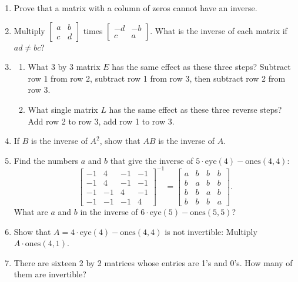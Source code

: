\documentclass[14pt, a4paper]{article}
\begin{document}
\begin{enumerate}
    \item Prove that a matrix with a column of zeros cannot have an inverse.

    \item Multiply $\begin{bmatrix} a & b \\ c & d \end{bmatrix}$ times $\begin{bmatrix} -d & -b \\ c & a \end{bmatrix}$. What is the inverse of each matrix if $ad \ne bc$?

    \item
          \begin{enumerate}
              \item What 3 by 3 matrix $E$ has the same effect as these three steps? Subtract row 1 from row 2, subtract row 1 from row 3, then subtract row 2 from row 3.
              \item What single matrix $L$ has the same effect as these three reverse steps? Add row 2 to row 3, add row 1 to row 3.
          \end{enumerate}

    \item If $B$ is the inverse of $A^2$, show that $AB$ is the inverse of $A$.

    \item Find the numbers $a$ and $b$ that give the inverse of $5\cdot\text{eye}(4)-\text{ones}(4,4)$:
          \[
              \begin{bmatrix}
                  -1 & 4  & -1 & -1 \\
                  -1 & 4  & -1 & -1 \\
                  -1 & -1 & 4  & -1 \\
                  -1 & -1 & -1 & 4
              \end{bmatrix}^{-1}
              =
              \begin{bmatrix}
                  a & b & b & b \\
                  b & a & b & b \\
                  b & b & a & b \\
                  b & b & b & a
              \end{bmatrix}.
          \]
          What are $a$ and $b$ in the inverse of $6\cdot\text{eye}(5)-\text{ones}(5,5)$?

    \item Show that $A = 4\cdot\text{eye}(4)-\text{ones}(4,4)$ is not invertible: Multiply $A\cdot\text{ones}(4,1)$.

    \item There are sixteen 2 by 2 matrices whose entries are 1's and 0's. How many of them are invertible?
\end{enumerate}
\end{document}
